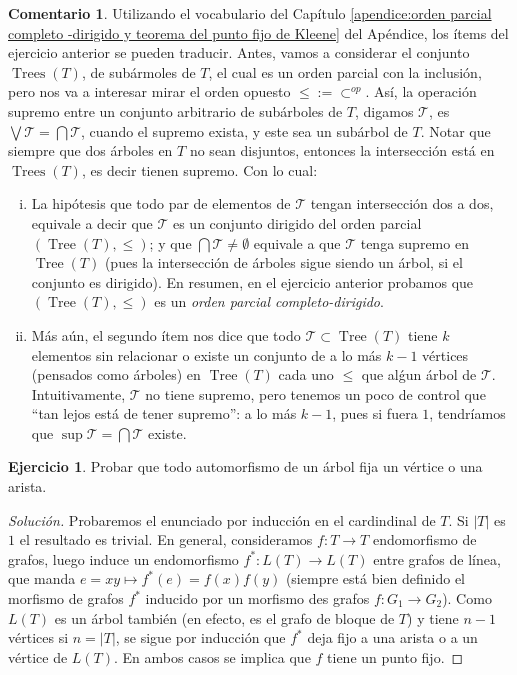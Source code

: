 \documentclass[12pt]{report}
\theoremstyle{plain}
\theoremstyle{definition}
\newtheorem{remark}[theorem]{Comentario}
\newtheorem{exercise}[theorem]{Ejercicio}
\newenvironment{solution}{\begin{proof}[Solución]}{\end{proof}}
\newcommand{\abs}[1]{\left \vert #1 \right \vert}
\begin{document}
\begin{remark}
Utilizando el vocabulario del Capítulo \ref{apendice:orden parcial completo
-dirigido y teorema del punto fijo de Kleene} del Apéndice, los ítems del ejercicio anterior se pueden traducir.
Antes, vamos a considerar el conjunto $\operatorname{Trees} (T)$, de subármoles de $T$, el cual es un orden parcial
con la inclusión, pero nos va a interesar mirar el orden opuesto $\leq:= \subset^{op}$. Así, la operación supremo
entre un conjunto arbitrario de subárboles de $T$, digamos $\mathcal T$, es $\bigvee \mathcal T = \bigcap \mathcal T$, cuando el supremo exista, y este sea un subárbol de $T$. Notar que siempre que dos árboles en $T$ no sean disjuntos, entonces la intersección está en $\operatorname{Trees} (T)$, es decir tienen supremo. Con lo cual:
\begin{enumerate}[(i)]
\item La hipótesis que todo par de elementos de $\mathcal T$ tengan intersección dos a dos, equivale a decir que $\mathcal T$ es
 un
conjunto dirigido del orden parcial $(\operatorname{Tree} (T), \leq )$; y que $\bigcap \mathcal T \neq \emptyset$
equivale a que $\mathcal T$ tenga supremo en $\operatorname{Tree} (T)$ (pues la intersección de árboles sigue siendo
un árbol, si el conjunto es dirigido). En resumen, en el ejercicio anterior probamos que $(\operatorname{Tree} (T), \leq)$ es un \textit{orden parcial completo-dirigido}.
\item Más aún, el segundo ítem nos dice que todo $\mathcal T \subset \operatorname{Tree}(T)$ tiene $k$ elementos sin
relacionar o existe un conjunto de a lo más $k-1$ vértices (pensados como árboles) en $\operatorname{Tree} (T)$ cada
uno $\leq$ que alǵun árbol de $\mathcal T$. Intuitivamente, $\mathcal T$ no tiene supremo, pero tenemos un poco de
control que ``tan lejos está de tener supremo'': a lo más $k-1$, pues si fuera $1$, tendríamos que $\sup \mathcal T = \bigcap \mathcal T $ existe.
\end{enumerate}
\end{remark}



\begin{exercise}\label{ejercicio:todo automorfismo de un arbol tiene un vertice o arista fijos}
    Probar que todo automorfismo de un árbol fija un vértice o una arista.
\end{exercise}
\begin{solution}
    Probaremos el enunciado por inducción en el cardindinal de $T$. Si $\abs T$ es $1$ el resultado es trivial.
    En general, consideramos $f : T \rightarrow T$ endomorfismo de grafos, luego induce un endomorfismo $f^* : L
     (T) \rightarrow L(T)$ entre grafos de línea, que manda $e = xy \mapsto f^*(e) = f(x)f(y)$ (siempre está bien
      definido el morfismo de grafos $f^*$ inducido por un morfismo des grafos $f : G_1 \rightarrow G_2$). Como $
      L(T)$ es un árbol también (en efecto, es el grafo de bloque de $T$) y tiene $n-1$ vértices si $n= \abs T$,
      se sigue por inducción que $f^*$ deja fijo a una arista o a un vértice de $L(T)$. En ambos casos se implica
       que $f$ tiene un punto fijo.
\end{solution}
\end{document}
